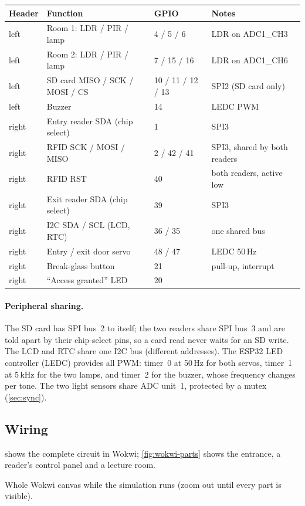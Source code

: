 {\small
\begin{longtable}{@{}llll@{}}
\toprule
Header & Function & GPIO & Notes \\
\midrule
\endhead
left  & Room 1: LDR / PIR / lamp & 4 / 5 / 6 & LDR on ADC1\_CH3 \\
left  & Room 2: LDR / PIR / lamp & 7 / 15 / 16 & LDR on ADC1\_CH6 \\
left  & SD card MISO / SCK / MOSI / CS & 10 / 11 / 12 / 13 & SPI2 (SD card only) \\
left  & Buzzer & 14 & LEDC PWM \\
right & Entry reader SDA (chip select) & 1 & SPI3 \\
right & RFID SCK / MOSI / MISO & 2 / 42 / 41 & SPI3, shared by both readers \\
right & RFID RST & 40 & both readers, active low \\
right & Exit reader SDA (chip select) & 39 & SPI3 \\
right & I2C SDA / SCL (LCD, RTC) & 36 / 35 & one shared bus \\
right & Entry / exit door servo & 48 / 47 & LEDC 50\,Hz \\
right & Break-glass button & 21 & pull-up, interrupt \\
right & ``Access granted'' LED & 20 & \\
\bottomrule
\end{longtable}
}

\paragraph{Peripheral sharing.} The SD card has SPI bus~2 to itself; the two readers share
SPI bus~3 and are told apart by their chip-select pins, so a card read never waits for an SD write.
The LCD and RTC share one I2C bus (different addresses). The ESP32
LED controller (LEDC) provides all PWM: timer~0 at 50\,Hz for both servos, timer~1 at 5\,kHz for
the two lamps, and timer~2 for the buzzer, whose frequency changes per tone. The two light sensors
share ADC unit~1, protected by a mutex (\cref{sec:sync}).

\subsection{Wiring}
\label{sec:wiring}
 shows the complete circuit in Wokwi; \cref{fig:wokwi-parts} shows the entrance,
a reader's control panel and a lecture room.

  {Whole Wokwi canvas while the simulation runs (zoom out until every part is visible).}

